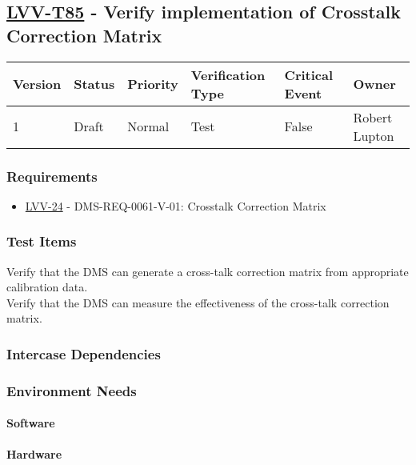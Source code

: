 \subsection{\href{https://jira.lsstcorp.org/secure/Tests.jspa\#/testCase/LVV-T85}{LVV-T85}
    - Verify implementation of Crosstalk Correction Matrix}\label{lvv-t85}

\begin{longtable}[]{llllll}
\toprule
Version & Status & Priority & Verification Type & Critical Event & Owner
\\\midrule
1 & Draft & Normal &
Test & False & Robert Lupton
\\\bottomrule
\end{longtable}

\subsubsection{Requirements}
\begin{itemize}
\item \href{https://jira.lsstcorp.org/browse/LVV-24}{LVV-24} - DMS-REQ-0061-V-01: Crosstalk Correction Matrix
\end{itemize}

\subsubsection{Test Items}
Verify that the DMS can generate a cross-talk correction matrix from
appropriate calibration data.\\
Verify that the DMS can measure the effectiveness of the cross-talk
correction matrix.



\subsubsection{Intercase Dependencies}

\subsubsection{Environment Needs}

\paragraph{Software}

\paragraph{Hardware}

